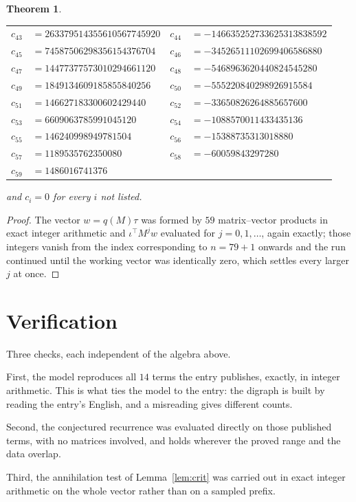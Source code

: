 \documentclass[11pt,a4paper]{article}
\theoremstyle{plain}
\newtheorem{theorem}{Theorem}
\theoremstyle{definition}
\begin{document}
\begin{theorem}
\begin{center}
\begin{tabular}{r@{\,}l@{\qquad}r@{\,}l}
$c_{43}$ & $=263379514355610567745920$ & $c_{44}$ & $=-146635252733625313838592$ \\
$c_{45}$ & $=74587506298356154376704$ & $c_{46}$ & $=-34526511102699406586880$ \\
$c_{47}$ & $=14477377573010294661120$ & $c_{48}$ & $=-5468963620440824545280$ \\
$c_{49}$ & $=1849134609185855840256$ & $c_{50}$ & $=-555220840298926915584$ \\
$c_{51}$ & $=146627183300602429440$ & $c_{52}$ & $=-33650826264885657600$ \\
$c_{53}$ & $=6609063785991045120$ & $c_{54}$ & $=-1088570011433435136$ \\
$c_{55}$ & $=146240998949781504$ & $c_{56}$ & $=-15388735313018880$ \\
$c_{57}$ & $=1189535762350080$ & $c_{58}$ & $=-60059843297280$ \\
$c_{59}$ & $=1486016741376$ \\
\end{tabular}
\end{center}
and $c_i=0$ for every $i$ not listed.
\end{theorem}

\begin{proof}
The vector $w=q(M)\tau$ was formed by $59$ matrix--vector products in exact integer
arithmetic and $\iota^{\!\top}M^{j}w$ evaluated for $j=0,1,\dots$, again exactly; those
integers vanish from the index corresponding to $n=79+1$ onwards and the run continued
until the working vector was identically zero, which settles every larger $j$ at once.
\end{proof}

\section{Verification}

Three checks, each independent of the algebra above.

First, the model reproduces all $14$ terms the entry publishes, exactly, in integer
arithmetic. This is what ties the model to the entry: the digraph is built by reading the
entry's English, and a misreading gives different counts.

Second, the conjectured recurrence was evaluated directly on those published terms, with no
matrices involved, and holds wherever the proved range and the data overlap.

Third, the annihilation test of Lemma~\ref{lem:crit} was carried out in exact integer
arithmetic on the whole vector rather than on a sampled prefix.
\end{document}
